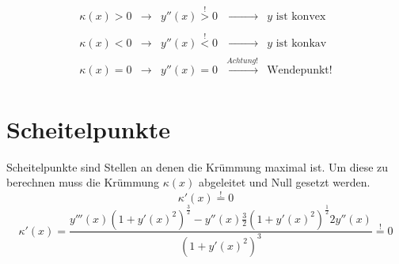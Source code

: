 \[\boxed{\begin{array}{lllll} 
	\kappa (x) > 0 & \rightarrow & y''(x) \stackrel{!}{>} 0 & \xrightarrow[]{\phantom{Achtung!}} & y \text{ ist konvex} \\
	\kappa (x) < 0 & \rightarrow & y''(x) \stackrel{!}{<} 0 & \xrightarrow[]{\phantom{Achtung!}} & y \text{ ist konkav} \\
	\kappa (x) = 0 & \rightarrow & y''(x) = 0		& \xrightarrow[]{Achtung!} & \text{Wendepunkt!}
\end{array}}\]
\section{Scheitelpunkte}
Scheitelpunkte sind Stellen an denen die Krümmung maximal ist. 
Um diese zu berechnen muss die Krümmung $\kappa (x)$ abgeleitet und Null gesetzt werden.
\[ \kappa '(x) \stackrel{!}{=} 0  \]
\[ \boxed{\kappa '(x) = \dfrac{ y'''(x)(1+y'(x)^2)^{\frac{3}{2}} - y''(x) \frac{3}{2}(1+y'(x)^2)^{\frac{1}{2}} 2y''(x) }{ (1+y'(x)^2)^3 } \stackrel{!}{=} 0 } \]
